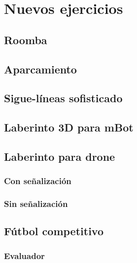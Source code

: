 \chapter{Nuevos ejercicios}
\label{chap:nuevos_ejercicios} 

   
\section{Roomba}
\section{Aparcamiento}
\section{Sigue-líneas sofisticado}
\section{ Laberinto 3D para mBot}
\section{Laberinto para drone}
\subsection{Con señalización}
\subsection{Sin señalización}
\section{Fútbol competitivo}
\subsection{Evaluador}

